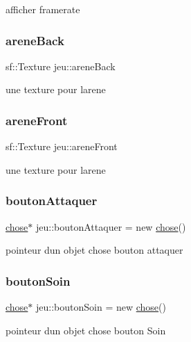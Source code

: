 afficher framerate \mbox{\label{classjeu_a5afb10301e3f76d2482ed9859c3db9bc}} 
\subsubsection{\texorpdfstring{arene\+Back}{areneBack}}
{\footnotesize\ttfamily sf\+::\+Texture jeu\+::arene\+Back}

une texture pour l\textquotesingle{}arene \mbox{\label{classjeu_aa42fb5a7a75a731cdabbabafbd8c6afa}} 
\subsubsection{\texorpdfstring{arene\+Front}{areneFront}}
{\footnotesize\ttfamily sf\+::\+Texture jeu\+::arene\+Front}

une texture pour l\textquotesingle{}arene \mbox{\label{classjeu_ac2abbfb40adca68f9d6ef5b3c34e2deb}} 
\subsubsection{\texorpdfstring{bouton\+Attaquer}{boutonAttaquer}}
{\footnotesize\ttfamily \mbox{\hyperlink{classchose}{chose}}$\ast$ jeu\+::bouton\+Attaquer = new \mbox{\hyperlink{classchose}{chose}}()}

pointeur d\textquotesingle{}un objet chose bouton attaquer \mbox{\label{classjeu_a6396acebe5d701ce532d0b27fb9468dd}} 
\subsubsection{\texorpdfstring{bouton\+Soin}{boutonSoin}}
{\footnotesize\ttfamily \mbox{\hyperlink{classchose}{chose}}$\ast$ jeu\+::bouton\+Soin = new \mbox{\hyperlink{classchose}{chose}}()}

pointeur d\textquotesingle{}un objet chose bouton Soin \mbox{\label{classjeu_a90c1e01c86044871fa86b3c1e1f3c3ea}} 
